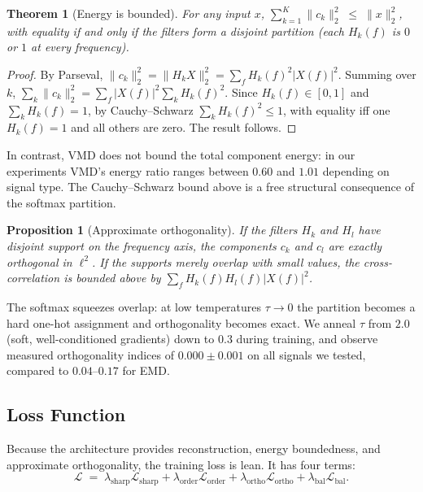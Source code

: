 \documentclass[journal]{IEEEtran}
\newtheorem{theorem}{Theorem}
\newtheorem{proposition}{Proposition}
\begin{document}
\begin{theorem}[Energy is bounded]
For any input $x$,
$\sum_{k=1}^{K} \|c_{k}\|_{2}^{2} \;\leq\; \|x\|_{2}^{2}$,
with equality if and only if the filters form a \emph{disjoint} partition (each $H_{k}(f)$ is $0$ or $1$ at every frequency).
\end{theorem}
\begin{proof}
By Parseval, $\|c_{k}\|_{2}^{2} = \|H_{k} X\|_{2}^{2} = \sum_{f} H_{k}(f)^{2} |X(f)|^{2}$. Summing over $k$,
$\sum_{k} \|c_{k}\|_{2}^{2} = \sum_{f} |X(f)|^{2} \sum_{k} H_{k}(f)^{2}$.
Since $H_{k}(f) \in [0,1]$ and $\sum_{k} H_{k}(f) = 1$, by Cauchy--Schwarz $\sum_{k} H_{k}(f)^{2} \leq 1$, with equality iff one $H_{k}(f) = 1$ and all others are zero. The result follows.
\end{proof}

In contrast, VMD does not bound the total component energy: in our experiments VMD's energy ratio ranges between $0.60$ and $1.01$ depending on signal type. The Cauchy--Schwarz bound above is a free structural consequence of the softmax partition.

\begin{proposition}[Approximate orthogonality]
If the filters $H_{k}$ and $H_{l}$ have disjoint support on the frequency axis, the components $c_{k}$ and $c_{l}$ are exactly orthogonal in $\ell^{2}$. If the supports merely overlap with small values, the cross-correlation is bounded above by $\sum_{f} H_{k}(f) H_{l}(f) |X(f)|^{2}$.
\end{proposition}

The softmax squeezes overlap: at low temperatures $\tau \to 0$ the partition becomes a hard one-hot assignment and orthogonality becomes exact. We anneal $\tau$ from $2.0$ (soft, well-conditioned gradients) down to $0.3$ during training, and observe measured orthogonality indices of $0.000 \pm 0.001$ on all signals we tested, compared to $0.04$--$0.17$ for EMD.

\subsection{Loss Function}
\label{sec:loss}

Because the architecture provides reconstruction, energy boundedness, and approximate orthogonality, the training loss is lean. It has four terms:
\begin{equation}
\mathcal{L} \;=\; \lambda_{\text{sharp}} \mathcal{L}_{\text{sharp}} + \lambda_{\text{order}} \mathcal{L}_{\text{order}} + \lambda_{\text{ortho}} \mathcal{L}_{\text{ortho}} + \lambda_{\text{bal}} \mathcal{L}_{\text{bal}}.
\label{eq:total-loss}
\end{equation}
\end{document}
